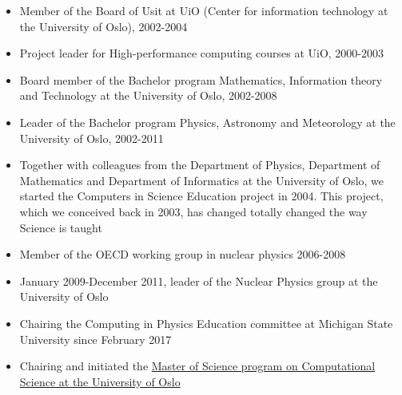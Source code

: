 \documentclass[a4wide,10pt]{article}
\begin{document}
\begin{itemize}
\item Member of the Board of Usit at UiO (Center for information technology at the University of Oslo), 2002-2004

\item Project leader for High-performance computing courses at UiO, 2000-2003

\item Board member of the Bachelor program Mathematics, Information theory and Technology at the University of Oslo, 2002-2008

\item Leader of the Bachelor program Physics, Astronomy and Meteorology at the University of Oslo, 2002-2011

\item Together with colleagues from the Department of Physics, Department of Mathematics and Department of Informatics at the University of Oslo, we started   the Computers in Science Education project in 2004. This project, which we conceived back in 2003,  has changed totally changed the way Science is taught

\item Member of the OECD working group in nuclear physics 2006-2008

\item January 2009-December 2011, leader of the Nuclear Physics group at the University of Oslo

\item Chairing the Computing in Physics Education committee at Michigan State University since February 2017 

\item Chairing and initiated the \href{{http://www.uio.no/english/studies/programmes/computational-science-master/}}{Master of Science program on Computational Science at the University of Oslo}
\end{itemize}

\end{document}
